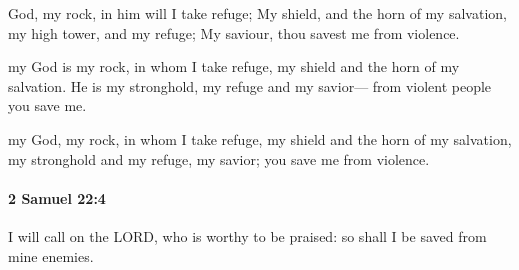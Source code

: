 			\begin{versebox}
					\item[BHS] 
					\item[ASV] God, my rock, in him will I take refuge; My shield, and the horn of my salvation, my high tower, and my refuge; My saviour, thou savest me from violence.
					\item[NIV] my God is my rock, in whom I take refuge, my shield and the horn of my salvation. He is my stronghold, my refuge and my savior— from violent people you save me.
					\item[NRSV] my God, my rock, in whom I take refuge, my shield and the horn of my salvation, my stronghold and my refuge, my savior; you save me from violence.
			\end{versebox}

		\paragraph{2 Samuel 22:4} %
			\label{2SAMUEL-22-4}

			I will call on the LORD, who is worthy to be praised: so shall I be saved from mine enemies.


